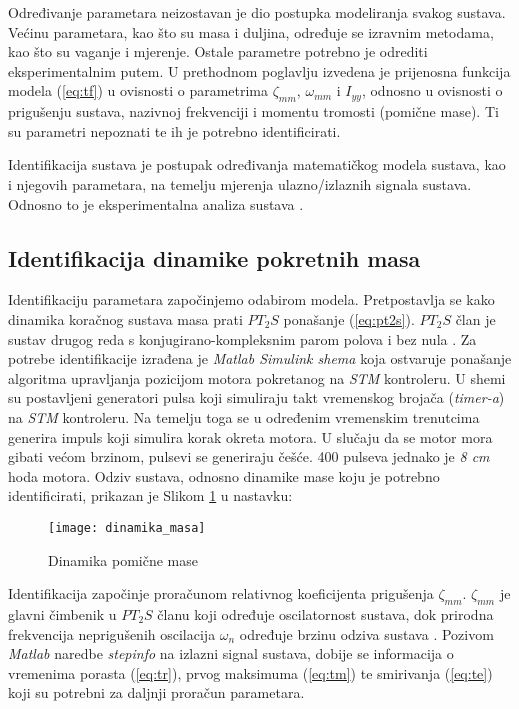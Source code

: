 \documentclass[11pt,a4paper]{article}
\begin{document}
Određivanje parametara neizostavan je dio postupka modeliranja svakog sustava. Većinu parametara, kao što su masa i duljina, određuje se izravnim metodama, kao što su vaganje i mjerenje. Ostale parametre potrebno je odrediti eksperimentalnim putem. U prethodnom poglavlju izvedena je prijenosna funkcija modela (\ref{eq:tf}) u ovisnosti o parametrima $\zeta_{mm}$, $\omega_{mm}$ i $I_{yy}$, odnosno u ovisnosti o prigušenju sustava, nazivnoj frekvenciji i momentu tromosti (pomične mase). Ti su parametri nepoznati te ih je potrebno identificirati. 

\medskip

Identifikacija sustava je postupak određivanja matematičkog modela sustava, kao i njegovih parametara, na temelju mjerenja ulazno/izlaznih signala sustava. Odnosno to je eksperimentalna analiza sustava \cite{te}.

\subsection{Identifikacija dinamike pokretnih masa}

Identifikaciju parametara započinjemo odabirom modela. Pretpostavlja se kako dinamika koračnog sustava masa prati $PT_{2}S$ ponašanje (\ref{eq:pt2s}). $PT_{2}S$ član je sustav drugog reda s konjugirano-kompleksnim parom polova i bez nula \cite{aupr}. Za potrebe identifikacije izrađena je \textit{Matlab Simulink shema} koja ostvaruje ponašanje algoritma upravljanja pozicijom motora pokretanog na \textit{STM} kontroleru. U shemi su postavljeni generatori pulsa koji simuliraju takt vremenskog brojača (\textit{timer-a}) na \textit{STM} kontroleru. Na temelju toga se u određenim vremenskim trenutcima generira impuls koji simulira korak okreta motora. U slučaju da se motor mora gibati većom brzinom, pulsevi se generiraju češće. 400 pulseva jednako je \textit{8 cm} hoda motora. Odziv sustava, odnosno dinamike mase koju je potrebno identificirati, prikazan je Slikom \ref{fig:masa} u nastavku:

\begin{figure}[H]
	\centering
	\texttt{[image: dinamika\_masa]}
	\caption{Dinamika pomične mase}
	\label{fig:masa}
\end{figure}


Identifikacija započinje proračunom relativnog koeficijenta prigušenja $\zeta_{mm}$. $\zeta_{mm}$ je glavni čimbenik u $PT_{2}S$ članu koji određuje oscilatornost sustava, dok prirodna frekvencija neprigušenih oscilacija $\omega_{n}$ određuje brzinu odziva sustava \cite{aupr}. Pozivom \textit{Matlab} naredbe \textit{stepinfo} na izlazni signal sustava, dobije se informacija o vremenima porasta (\ref{eq:tr}), prvog maksimuma (\ref{eq:tm}) te smirivanja (\ref{eq:te}) koji su potrebni za daljnji proračun parametara. 
\end{document}
